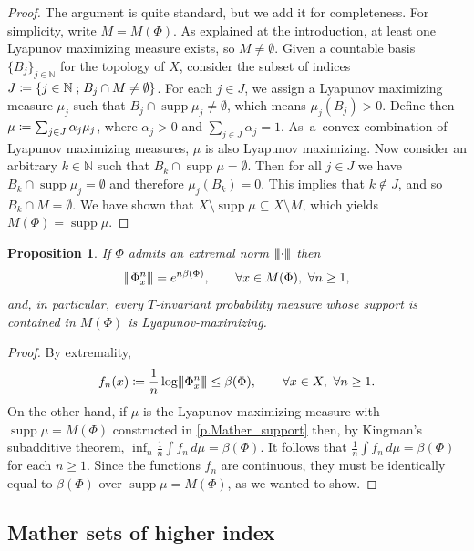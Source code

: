 \documentclass[JEP,XML,SOM,Unicode]{cedram}
\def\vcentcolon{\mathrel{\mathop\ordinarycolon}}
\providecommand\ordinarycolon{:}
\providecommand*\coloneqq{\vcentcolon\mathrel{\mkern-1.2mu}=}
\theoremstyle{plain}
\newtheorem{proposition}[theorem]{Proposition}
\theoremstyle{definition}
\newcommand{\tribar}[1]{\mathopen{| {\kern -1.5pt} | {\kern -1.5pt} |} {#1}
\mathclose{| {\kern -1.5pt} | {\kern -1.5pt} |}}
\newcommand{\NN}{\mathbb{N}}
\newcommand{\st}{\;\mathord{;}\;}
\DeclareMathOperator{\supp}{supp}
\begin{document}
\begin{proof}
The argument is quite standard, but we add it for completeness.
For simplicity, write $M = M(\Phi)$.
As explained at the introduction, at least one Lyapunov maximizing measure exists, so $M \neq \emptyset$.
Given a countable basis $\{B_j\}_{j\in\NN}$ for the topology of $X$, consider the subset of indices $ J \coloneqq \{ j \in \NN \st B_j \cap M \neq \emptyset \} $.
For each $ j \in J $, we assign a Lyapunov maximizing measure $\mu_j$ such that $B_j \cap \supp \mu_j \neq \emptyset $, which means $\mu_j(B_j)>0$.
Define then $ \mu\coloneqq\sum_{j \in J} \alpha_j \mu_j$, where $ \alpha_j>0$ and $ \sum_{j \in J} \alpha_j = 1 $. As~a~convex combination of Lyapunov maximizing measures, $ \mu$ is also Lyapunov maximizing.
Now consider an arbitrary $k \in \NN$ such that $B_k \cap \supp \mu = \emptyset $.
Then for all $ j \in J $ we have $B_k \cap \supp \mu_j = \emptyset $ and therefore $\mu_j(B_k)=0$.
This implies that $k\not\in J$, and so $B_k \cap M = \emptyset$.
We have shown that $ X \setminus \supp \mu \subseteq X \setminus M$, which yields $M(\Phi) = \supp \mu$.
\end{proof}

\begin{proposition}\label{p.Mather_calibration}
If $\Phi$ admits an extremal norm $ \tribar{\cdot}$ then
\begin{equation*}
\tribar{\Phi_x^n} = e^{n \beta(\Phi)}, \qquad \forall x \in M(\Phi),\ \forall n \ge 1,
\end{equation*}
and, in particular, every $T$-invariant probability measure whose support is contained in $M(\Phi)$ is Lyapunov-maximizing.
\end{proposition}

\begin{proof}
By extremality,
\[
f_n(x) \coloneqq \frac{1}{n}\log \tribar{\Phi_x^n} \le \beta(\Phi), \qquad \forall x \in X,\ \forall n \ge 1.
\]
On the other hand, if $\mu$ is the Lyapunov maximizing measure with $\supp \mu = M(\Phi)$ constructed in \cref{p.Mather_support} then, by Kingman's subadditive theorem,
$ \inf_n \frac{1}{n} \int f_n \, d\mu = \beta(\Phi) $.
It follows that $\frac{1}{n} \int f_n \, d\mu = \beta(\Phi)$ for each $n \ge 1$.
Since the functions $f_n$ are continuous, they must be identically equal to $\beta(\Phi)$ over $\supp \mu = M(\Phi)$,
as we wanted to show.
\end{proof}

\subsection{Mather sets of higher index} \label{ss.other_Mathers}
\end{document}
